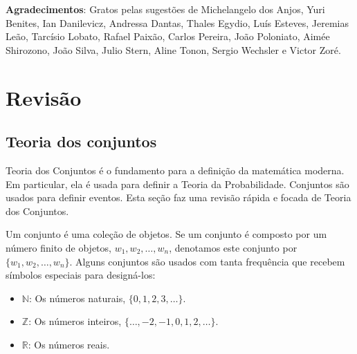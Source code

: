



\maketitle

\vspace{20mm}

\textbf{Agradecimentos}: Gratos pelas sugestões de
Michelangelo dos Anjos, Yuri Benites, Ian Danilevicz, Andressa Dantas, Thales Egydio, Luís Esteves, Jeremias Leão, Tarcísio Lobato, Rafael Paixão, Carlos Pereira, João Poloniato,  Aimée Shirozono, João Silva, Julio Stern, Aline Tonon, Sergio Wechsler e Victor Zoré.

\newpage
 
\tableofcontents
  
\newpage

\begin{knitrout}
\color{fgcolor}\begin{kframe}
\begin{alltt}
 \hlopt{$}\hlstd{(}\hlstd{=}\hlstd{,}\hlstd{=}\hlstd{)}
\end{alltt}
\end{kframe}
\end{knitrout}



\section{Revisão}
\label{sec:prologue}

\subsection{Teoria dos conjuntos}
\label{sec:sets}
  
	Teoria dos Conjuntos é o fundamento para a definição da matemática moderna.
	Em particular, ela é usada para definir a Teoria da Probabilidade.
	Conjuntos são usados para definir eventos.
	Esta seção faz uma revisão rápida e focada de Teoria dos Conjuntos.
  
	Um conjunto é uma coleção de objetos.
	Se um conjunto é composto por um número finito de objetos, $w_{1}, w_{2}, \ldots, w_{n}$,
	denotamos este conjunto por $\{w_{1},w_{2},\ldots,w_{n}\}$.
	Alguns conjuntos são usados com tanta frequência que recebem símbolos especiais para designá-los:
	\begin{itemize}
	 \item $\mathbb{N}$: Os números naturais, $\{0,1,2,3,\ldots\}$.
	 \item $\mathbb{Z}$: Os números inteiros, $\{\ldots,-2,-1,0,1,2,\ldots\}$.
	 \item $\mathbb{R}$: Os números reais.
	\end{itemize}
  
